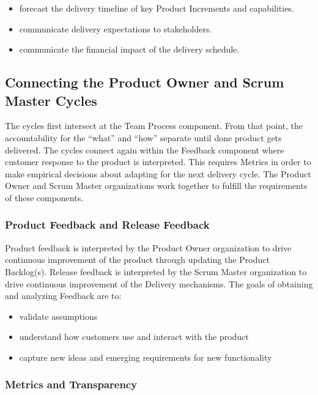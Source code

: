 \documentclass[12pt,a4paper,parskip=full]{scrartcl}
\begin{document}
\begin{itemize}
\itemsep1pt\parskip0pt
\item
  forecast the delivery timeline of key Product Increments and
  capabilities.
\item
  communicate delivery expectations to stakeholders.
\item
  communicate the financial impact of the delivery schedule.
\end{itemize}

\subsection{Connecting the Product Owner and Scrum Master
Cycles}\label{Connecting-the-product-owner-and-scrum-master-cycles}

The cycles first intersect at the Team Process component. From that point, the accountability for the ``what'' and ``how'' separate until done product gets delivered. The cycles connect again within the Feedback component where customer response to the product is interpreted. This requires Metrics in order to make empirical decisions about adapting for the next delivery cycle. The Product Owner and Scrum Master organizations work together to fulfill the requirements of these components.

\subsubsection{Product Feedback and Release
Feedback}\label{product-feedback-and-release-feedback}

Product feedback is interpreted by the Product Owner organization to drive continuous improvement of the product through updating the Product Backlog(s). Release feedback is interpreted by the Scrum Master organization to drive continuous improvement of the Delivery mechanisms. The goals of obtaining and analyzing Feedback are to:

\begin{itemize}
\itemsep1pt\parskip0pt
\item
  validate assumptions
\item
  understand how customers use and interact with the product
\item
  capture new ideas and emerging requirements for new functionality
\end{itemize}

\subsubsection{Metrics and Transparency}\label{Metrics-and-transparency}
\end{document}
